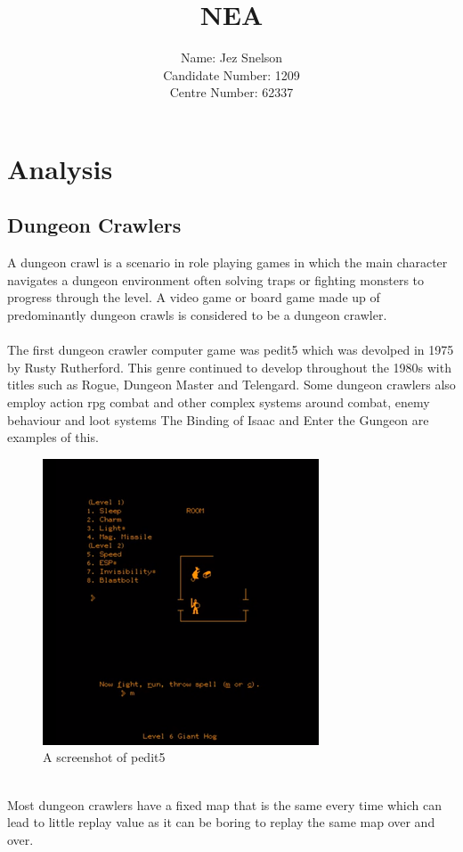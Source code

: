 \documentclass{article}
\title{\textbf{NEA}}
\author{Name: Jez Snelson\\
        Candidate Number: 1209\\
        Centre Number: 62337}
\begin{document}
\date{}
\pagestyle{empty}
\maketitle
\newpage
\tableofcontents
\newpage
\pagestyle{fancy}
\section{Analysis}
        \subsection{Dungeon Crawlers}
        A dungeon crawl is a scenario in role playing games in which the main character navigates a dungeon environment often solving traps or fighting monsters to progress through the level. A video game or board game made up of predominantly dungeon crawls is considered to be a dungeon crawler.\\
        \\
        The first dungeon crawler computer game was pedit5 which was devolped in 1975 by Rusty Rutherford. This genre continued to develop throughout the 1980s with titles such as Rogue, Dungeon Master and Telengard. Some dungeon crawlers also employ action rpg combat and other complex systems around combat, enemy behaviour and loot systems The Binding of Isaac and Enter the Gungeon are examples of this.\\
        \begin{figure}[h]
                \centering
                \includegraphics[scale=0.6]{images/research/Pedit5_gameplay.png}
                \caption{A screenshot of pedit5}
                \label{fig:ie_0}
        \end{figure}
        \\
        Most dungeon crawlers have a fixed map that is the same every time which can lead to little replay value as it can be boring to replay the same map over and over.\\
\end{document}
